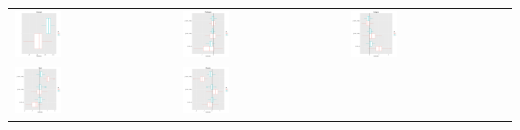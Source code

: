           	\begin{table}[ht]
          		\centering
          		\begin{tabular}{lll}
          			\includegraphics[width = 0.3\textwidth]{plots/DareIntercept-1.png} &
          			\includegraphics[width = 0.3\textwidth]{plots/DareOutdegree-1.png} &
          			\includegraphics[width = 0.3\textwidth]{plots/DareIndegree-1.png} \\
          			\includegraphics[width = 0.3\textwidth]{plots/DareBSend-1.png} &
          			\includegraphics[width = 0.3\textwidth]{plots/DareBReceive-1.png} &

\end{tabular}
\end{table}
